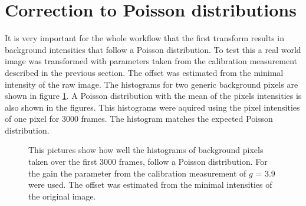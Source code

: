 \section{Correction to Poisson distributions}
It is very important for the whole workflow that the first transform results in background intensities that follow a Poisson distribution. To test this a real world image was transformed with parameters taken from the calibration measurement described in the previous section. The offset was estimated from the minimal intensity of the raw image. The histograms for two generic background pixels are shown in figure \ref{isitPoisson}. A Poisson distribution with the mean of the pixels intensities is also shown in the figures. This histograms were aquired using the pixel intensities of one pixel for 3000 frames. The histogram matches the expected Poisson distribution.
\begin{figure}
\hfill
{}
	\caption{This pictures show how well the histograms of background pixels taken over the first 3000 frames, follow a Poisson distribution. For the gain the parameter from the calibration measurement of $g$ = 3.9 were used. The offset was estimated from the minimal intensities of the original image.}
	\label{isitPoisson}	
\end{figure}

